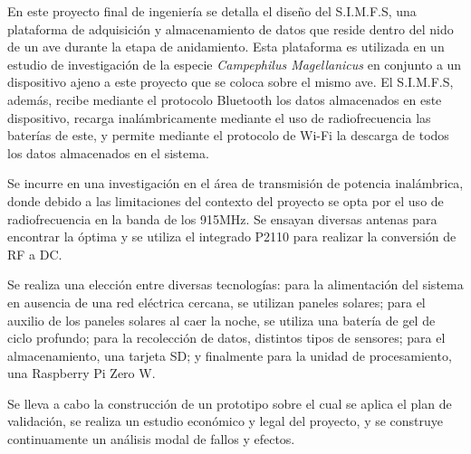 

En este proyecto final de ingeniería se detalla el diseño del S.I.M.F.S, una plataforma de adquisición y almacenamiento de datos que reside dentro del nido de un ave durante la etapa de anidamiento. Esta plataforma es utilizada en un estudio de investigación de la especie \textit{Campephilus Magellanicus} en conjunto a un dispositivo ajeno a este proyecto que se coloca sobre el mismo ave. El S.I.M.F.S, además, recibe mediante el protocolo Bluetooth los datos almacenados en este dispositivo, recarga inalámbricamente mediante el uso de radiofrecuencia las baterías de este, y permite mediante el protocolo de Wi-Fi la descarga de todos los datos almacenados en el sistema. 

Se incurre en una investigación en el área de transmisión de potencia inalámbrica, donde debido a las limitaciones del contexto del proyecto se opta por el uso de radiofrecuencia en la banda de los 915MHz. Se ensayan diversas antenas para encontrar la óptima y se utiliza el integrado P2110 para realizar la conversión de RF a DC.

Se realiza una elección entre diversas tecnologías: para la alimentación del sistema en ausencia de una red eléctrica cercana, se utilizan paneles solares; para el auxilio de los paneles solares al caer la noche, se utiliza una batería de gel de ciclo profundo; para la recolección de datos, distintos tipos de sensores; para el almacenamiento, una tarjeta SD; y finalmente para la unidad de procesamiento, una Raspberry Pi Zero W.

Se lleva a cabo la construcción de un prototipo sobre el cual se aplica el plan de validación, se realiza un estudio económico y legal del proyecto, y se construye continuamente un análisis modal de fallos y efectos.





%
